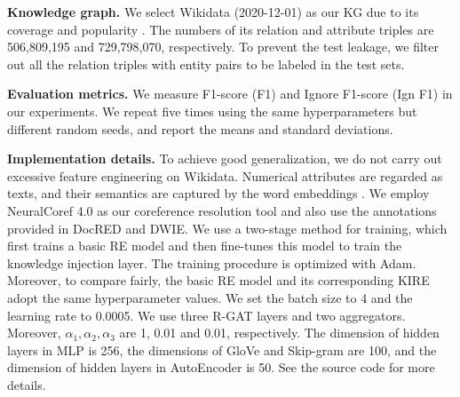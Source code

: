 \documentclass[runningheads]{llncs}
\begin{document}
\begin{table}[!tb]\setlength\tabcolsep{2pt}
\caption{Dataset statistics. Inst. denotes relation instances excluding N/A relation.}
\centering
{}
\label{tab:stat} 
\end{table}

\textbf{Knowledge graph.} We select Wikidata (2020-12-01) as our KG due to its coverage and popularity \cite{bastos2021recon,vashishth2018reside}. 
The numbers of its relation and attribute triples are 506,809,195 and 729,798,070, respectively. 
To prevent the test leakage, we filter out all the relation triples with entity pairs to be labeled in the test sets. 

\textbf{Evaluation metrics.} 
We measure F1-score (F1) and Ignore F1-score (Ign F1) in our experiments. 
We repeat five times using the same hyperparameters but different random seeds, and report the means and standard deviations.

\textbf{Implementation details.} To achieve good generalization, we do not carry out excessive feature engineering on Wikidata. 
Numerical attributes are regarded as texts, and their semantics are captured by the word embeddings \cite{pennington2014glove}.
We employ NeuralCoref 4.0 as our coreference resolution tool and also use the annotations provided in DocRED and DWIE.
We use a two-stage method for training, which first trains a basic RE model and then fine-tunes this model to train the knowledge injection layer.
The training procedure is optimized with Adam.
Moreover, to compare fairly, the basic RE model and its corresponding KIRE adopt the same hyperparameter values. 
We set the batch size to 4 and the learning rate to 0.0005. 
We use three R-GAT layers and two aggregators.
Moreover, $\alpha_1,\alpha_2,\alpha_3$ are 1, 0.01 and 0.01, respectively. 
The dimension of hidden layers in MLP is 256, the dimensions of GloVe and Skip-gram are 100, and the dimension of hidden layers in AutoEncoder is 50. 
See the source code for more details.
\end{document}
